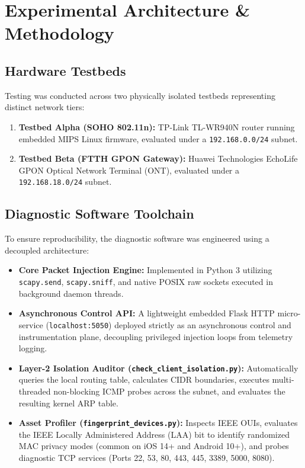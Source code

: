 \documentclass[conference]{IEEEtran}
\begin{document}
\section{Experimental Architecture \& Methodology}
\subsection{Hardware Testbeds}
Testing was conducted across two physically isolated testbeds representing distinct network tiers:
\begin{enumerate}
    \item \textbf{Testbed Alpha (SOHO 802.11n):} TP-Link TL-WR940N router running embedded MIPS Linux firmware, evaluated under a \texttt{192.168.0.0/24} subnet.
    \item \textbf{Testbed Beta (FTTH GPON Gateway):} Huawei Technologies EchoLife GPON Optical Network Terminal (ONT), evaluated under a \texttt{192.168.18.0/24} subnet.
\end{enumerate}

\subsection{Diagnostic Software Toolchain}
To ensure reproducibility, the diagnostic software was engineered using a decoupled architecture:
\begin{itemize}
    \item \textbf{Core Packet Injection Engine:} Implemented in Python 3 utilizing \texttt{scapy.send}, \texttt{scapy.sniff}, and native POSIX raw sockets executed in background daemon threads.
    \item \textbf{Asynchronous Control API:} A lightweight embedded Flask HTTP micro-service (\texttt{localhost:5050}) deployed strictly as an asynchronous control and instrumentation plane, decoupling privileged injection loops from telemetry logging.
    \item \textbf{Layer-2 Isolation Auditor (\texttt{check\_client\_isolation.py}):} Automatically queries the local routing table, calculates CIDR boundaries, executes multi-threaded non-blocking ICMP probes across the subnet, and evaluates the resulting kernel ARP table.
    \item \textbf{Asset Profiler (\texttt{fingerprint\_devices.py}):} Inspects IEEE OUIs, evaluates the IEEE Locally Administered Address (LAA) bit to identify randomized MAC privacy modes (common on iOS 14+ and Android 10+), and probes diagnostic TCP services (Ports 22, 53, 80, 443, 445, 3389, 5000, 8080).
\end{itemize}
\end{document}

